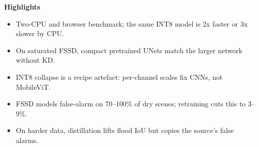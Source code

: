 \documentclass[11pt]{article}
\begin{document}
\begin{center}\Large\textbf{Highlights}\end{center}

\begin{itemize}
\item Two-CPU and browser benchmark; the same INT8 model is 2x faster or 3x slower by CPU.
\item On saturated FSSD, compact pretrained UNets match the larger network without KD.
\item INT8 collapse is a recipe artefact: per-channel scales fix CNNs, not MobileViT.
\item FSSD models false-alarm on 70--100\% of dry scenes; retraining cuts this to 3--9\%.
\item On harder data, distillation lifts flood IoU but copies the source's false alarms.
\end{itemize}
\end{document}

